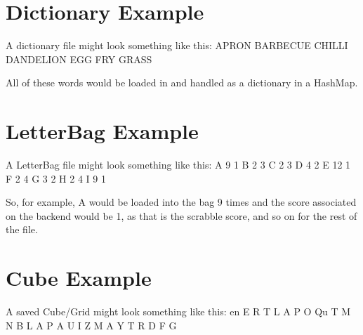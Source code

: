 \begin{appendices}
\section{Dictionary Example} \label{DictionaryExample}
    A dictionary file might look something like this:\newline
    APRON\newline
    BARBECUE\newline
    CHILLI\newline
    DANDELION\newline
    EGG\newline
    FRY\newline
    GRASS
    
    All of these words would be loaded in and handled as a dictionary in a HashMap.
\section{LetterBag Example} \label{LetterBagExample}
    A LetterBag file might look something like this:\newline
    A 9 1\newline
    B 2 3\newline
    C 2 3\newline
    D 4 2\newline
    E 12 1\newline
    F 2 4\newline
    G 3 2\newline
    H 2 4\newline
    I 9 1
    
    So, for example, A would be loaded into the bag 9 times and the score associated on the backend would be 1, as that is the scrabble score, and so on for the rest of the file.
\section{Cube Example} \label{CubeExample}
    A saved Cube/Grid might look something like this:\newline
    en\newline
    E R T\newline
    L A P\newline
    O Qu T\newline
    M N B\newline
    L A P\newline
    A U I\newline
    Z M A\newline
    Y T R\newline
    D F G
    

\end{appendices}
